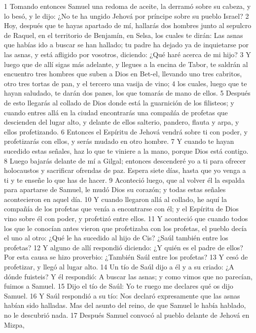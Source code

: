 1 Tomando entonces Samuel una redoma de aceite, la derramó sobre su cabeza, y lo besó, y le dijo: ¿No te ha ungido Jehová por príncipe sobre su pueblo Israel?
2 Hoy, después que te hayas apartado de mí, hallarás dos hombres junto al sepulcro de Raquel, en el territorio de Benjamín, en Selsa, los cuales te dirán: Las asnas que habías ido a buscar se han hallado; tu padre ha dejado ya de inquietarse por las asnas, y está afligido por vosotros, diciendo: ¿Qué haré acerca de mi hijo?
3 Y luego que de allí sigas más adelante, y llegues a la encina de Tabor, te saldrán al encuentro tres hombres que suben a Dios en Bet-el, llevando uno tres cabritos, otro tres tortas de pan, y el tercero una vasija de vino;
4 los cuales, luego que te hayan saludado, te darán dos panes, los que tomarás de mano de ellos.
5 Después de esto llegarás al collado de Dios donde está la guarnición de los filisteos; y cuando entres allá en la ciudad encontrarás una compañía de profetas que descienden del lugar alto, y delante de ellos salterio, pandero, flauta y arpa, y ellos profetizando.
6 Entonces el Espíritu de Jehová vendrá sobre ti con poder, y profetizarás con ellos, y serás mudado en otro hombre.
7 Y cuando te hayan sucedido estas señales, haz lo que te viniere a la mano, porque Dios está contigo.
8 Luego bajarás delante de mí a Gilgal; entonces descenderé yo a ti para ofrecer holocaustos y sacrificar ofrendas de paz. Espera siete días, hasta que yo venga a ti y te enseñe lo que has de hacer.
9 Aconteció luego, que al volver él la espalda para apartarse de Samuel, le mudó Dios su corazón; y todas estas señales acontecieron en aquel día.
10 Y cuando llegaron allá al collado, he aquí la compañía de los profetas que venía a encontrarse con él; y el Espíritu de Dios vino sobre él con poder, y profetizó entre ellos.
11 Y aconteció que cuando todos los que le conocían antes vieron que profetizaba con los profetas, el pueblo decía el uno al otro: ¿Qué le ha sucedido al hijo de Cis? ¿Saúl también entre los profetas?
12 Y alguno de allí respondió diciendo: ¿Y quién es el padre de ellos? Por esta causa se hizo proverbio: ¿También Saúl entre los profetas?
13 Y cesó de profetizar, y llegó al lugar alto.
14 Un tío de Saúl dijo a él y a su criado: ¿A dónde fuisteis? Y él respondió: A buscar las asnas; y como vimos que no parecían, fuimos a Samuel.
15 Dijo el tío de Saúl: Yo te ruego me declares qué os dijo Samuel.
16 Y Saúl respondió a su tío: Nos declaró expresamente que las asnas habían sido halladas. Mas del asunto del reino, de que Samuel le había hablado, no le descubrió nada.
17 Después Samuel convocó al pueblo delante de Jehová en Mizpa,

